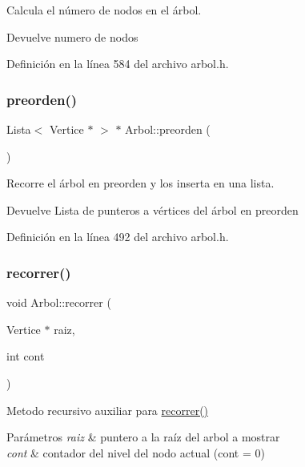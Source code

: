 Calcula el número de nodos en el árbol. 

\begin{DoxyReturn}{Devuelve}
numero de nodos 
\end{DoxyReturn}


Definición en la línea 584 del archivo arbol.\+h.

\mbox{\label{classArbol_a0ffdc60ce8f2267366681cc94cf6beea}} 
\subsubsection{\texorpdfstring{preorden()}{preorden()}}
{\footnotesize\ttfamily Lista$<$ Vertice $\ast$ $>$ $\ast$ Arbol\+::preorden (\begin{DoxyParamCaption}{ }\end{DoxyParamCaption})}



Recorre el árbol en preorden y los inserta en una lista. 

\begin{DoxyReturn}{Devuelve}
Lista de punteros a vértices del árbol en preorden 
\end{DoxyReturn}


Definición en la línea 492 del archivo arbol.\+h.

\mbox{\label{classArbol_a0ae46c572d300cd4a5f27b7d00a1a14e}} 
\subsubsection{\texorpdfstring{recorrer()}{recorrer()}}
{\footnotesize\ttfamily void Arbol\+::recorrer (\begin{DoxyParamCaption}\item[{Vertice $\ast$}]{raiz,  }\item[{int}]{cont }\end{DoxyParamCaption})}



Metodo recursivo auxiliar para \hyperlink{classArbol_a5bd356760f63521e8578a83613aa4792}{recorrer()} 


\begin{DoxyParams}{Parámetros}
{\em raiz} & puntero a la raíz del arbol a mostrar \\
\hline
{\em cont} & contador del nivel del nodo actual (cont = 0) \\
\hline
\end{DoxyParams}


